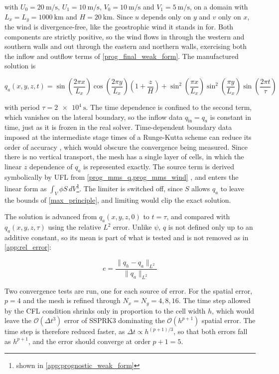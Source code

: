 \documentclass{article}
\begin{document}
with $U_0 = \qty{20}{\meter\per\second}$, $U_1 = \qty{10}{\meter\per\second}$, $V_0 = \qty{10}{\meter\per\second}$ and $V_1 = \qty{5}{\meter\per\second}$, on a domain with $L_x = L_y = \qty{1000}{\km}$ and $H = \qty{20}{\km}$.
Since $u$ depends only on $y$ and $v$ only on $x$, the wind is divergence-free, like the geostrophic wind it stands in for.
Both components are strictly positive, so the wind flows in through the western and southern walls and out through the eastern and northern walls, exercising both the inflow and outflow terms of \cref{prog_final_weak_form}.
The manufactured solution is

\begin{equation}\label{prog_mms_q}
    q_a(x,y,z,t) = \sin\left(\frac{2\pi x}{L_x}\right) \cos\left(\frac{2\pi y}{L_x}\right) \left(1 + \frac{z}{H}\right) + \sin^2\left(\frac{\pi x}{L_x}\right) \sin^2\left(\frac{\pi y}{L_x}\right) \sin\left(\frac{2\pi t}{\tau}\right)
\end{equation}

with period $\tau = \qty{2e4}{\second}$.
The time dependence is confined to the second term, which vanishes on the lateral boundary, so the inflow data $q_\text{in} = q_a$ is constant in time, just as it is frozen in the real solver.
Time-dependent boundary data imposed at the intermediate stage times of a Runge-Kutta scheme can reduce its order of accuracy \cite{Carpenter1995}, which would obscure the convergence being measured.
Since there is no vertical transport, the mesh has a single layer of cells, in which the linear $z$ dependence of $q_a$ is represented exactly.
The source term is derived symbolically by UFL from \cref{prog_mms_q,prog_mms_wind} \cite{UFL}, and enters the linear form as $\int_V \phi S \,dV$\footnote{shown in \cref{app:prognostic_weak_form}}.
The limiter is switched off, since $S$ allows $q_a$ to leave the bounds of \cref{max_principle}, and limiting would clip the exact solution.

The solution is advanced from $q_a(x,y,z,0)$ to $t = \tau$, and compared with $q_a(x,y,z,\tau)$ using the relative $L^2$ error.
Unlike $\psi$, $q$ is not defined only up to an additive constant, so its mean is part of what is tested and is not removed as in \cref{app:rel_error}:

\begin{equation}\label{prog_rel_error}
    e = \frac{\lVert q_h - q_a \rVert_{L^2}}{\lVert q_a \rVert_{L^2}}
\end{equation}

Two convergence tests are run, one for each source of error.
For the spatial error, $p = 4$ and the mesh is refined through $N_x = N_y = 4, 8, 16$.
The time step allowed by the CFL condition shrinks only in proportion to the cell width $h$, which would leave the $\mathcal{O}(\Delta t^3)$ error of SSPRK3 dominating the $\mathcal{O}(h^{p+1})$ spatial error.
The time step is therefore reduced faster, as $\Delta t \propto h^{(p+1)/3}$, so that both errors fall as $h^{p+1}$, and the error should converge at order $p + 1 = 5$.
\end{document}
